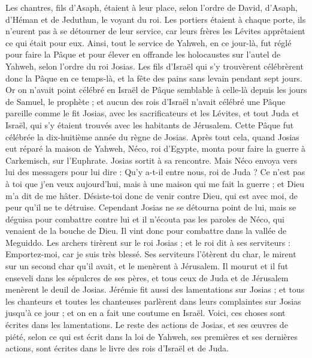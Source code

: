 \begin{multicols}{2}
Les chantres, fils d'Asaph, étaient à leur place, selon l'ordre de David, d'Asaph, d'Héman et de Jeduthun, le voyant du roi. Les portiers étaient à chaque porte, ils n'eurent pas à se détourner de leur service, car leurs frères les Lévites apprêtaient ce qui était pour eux.
Ainsi, tout le service de Yahweh, en ce jour-là, fut réglé pour faire la Pâque et pour élever en offrande les holocaustes sur l'autel de Yahweh, selon l'ordre du roi Josias.
Les fils d'Israël qui s'y trouvèrent célébrèrent donc la Pâque en ce temps-là, et la fête des pains sans levain pendant sept jours.
Or on n'avait point célébré en Israël de Pâque semblable à celle-là depuis les jours de Samuel, le prophète ; et aucun des rois d'Israël n'avait célébré une Pâque pareille comme le fit Josias, avec les sacrificateurs et les Lévites, et tout Juda et Israël, qui s'y étaient trouvés avec les habitants de Jérusalem.
Cette Pâque fut célébrée la dix-huitième année du règne de Josias.
Après tout cela, quand Josias eut réparé la maison de Yahweh, Néco, roi d'Egypte, monta pour faire la guerre à Carkemisch, sur l'Euphrate. Josias sortit à sa rencontre.
Mais Néco envoya vers lui des messagers pour lui dire : Qu'y a-t-il entre nous, roi de Juda ? Ce n'est pas à toi que j'en veux aujourd'hui, mais à une maison qui me fait la guerre ; et Dieu m'a dit de me hâter. Désiste-toi donc de venir contre Dieu, qui est avec moi, de peur qu'il ne te détruise.
Cependant Josias ne se détourna point de lui, mais se déguisa pour combattre contre lui et il n'écouta pas les paroles de Néco, qui venaient de la bouche de Dieu. Il vint donc pour combattre dans la vallée de Meguiddo.
Les archers tirèrent sur le roi Josias ; et le roi dit à ses serviteurs : Emportez-moi, car je suis très blessé.
Ses serviteurs l'ôtèrent du char, le mirent sur un second char qu'il avait, et le menèrent à Jérusalem. Il mourut et il fut enseveli dans les sépulcres de ses pères, et tous ceux de Juda et de Jérusalem menèrent le deuil de Josias.
Jérémie fit aussi des lamentations sur Josias ; et tous les chanteurs et toutes les chanteuses parlèrent dans leurs complaintes sur Josias jusqu'à ce jour ; et on en a fait une coutume en Israël. Voici, ces choses sont écrites dans les lamentations.
Le reste des actions de Josias, et ses œuvres de piété, selon ce qui est écrit dans la loi de Yahweh,
ses premières et ses dernières actions, sont écrites dans le livre des rois d'Israël et de Juda.

\end{multicols}
